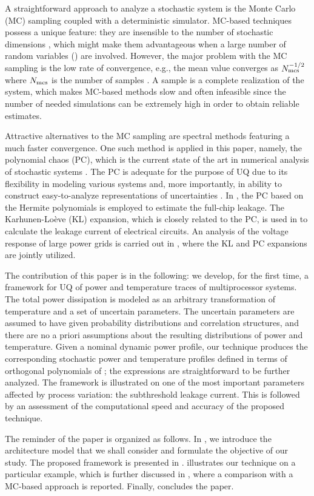 A straightforward approach to analyze a stochastic system is the Monte Carlo (MC) sampling coupled with a deterministic simulator. MC-based techniques possess a unique feature: they are insensible to the number of stochastic dimensions \cite{maitre2010}, which might make them advantageous when a large number of random variables (\rvs) are involved. However, the major problem with the MC sampling is the low rate of convergence, e.g., the mean value converges as $N_\text{mcs}^{-{{1}/{2}}}$ where $N_\text{mcs}$ is the number of samples \cite{xiu2010, maitre2010}. A sample is a complete realization of the system, which makes MC-based methods slow and often infeasible since the number of needed simulations can be extremely high in order to obtain reliable estimates.

Attractive alternatives to the MC sampling are spectral methods \cite{xiu2010, maitre2010, ghanem1991} featuring a much faster convergence. One such method is applied in this paper, namely, the polynomial chaos (PC), which is the current state of the art in numerical analysis of stochastic systems \cite{xiu2010}. The PC is adequate for the purpose of UQ due to its flexibility in modeling various systems and, more importantly, in ability to construct easy-to-analyze representations of uncertainties \cite{eldred2009}. In \cite{shen2009}, the PC based on the Hermite polynomials is employed to estimate the full-chip leakage. The Karhunen-Lo\`{e}ve (KL) expansion, which is closely related to the PC, is used in \cite{bhardwaj2006} to calculate the leakage current of electrical circuits. An analysis of the voltage response of large power grids is carried out in \cite{ghanta2006}, where the KL and PC expansions are jointly utilized.

The contribution of this paper is in the following: we develop, for the first time, a framework for UQ of power and temperature traces of multiprocessor systems. The total power dissipation is modeled as an arbitrary transformation of temperature and a set of uncertain parameters. The uncertain parameters are assumed to have given probability distributions and correlation structures, and there are no a priori assumptions about the resulting distributions of power and temperature. Given a nominal dynamic power profile, our technique produces the corresponding stochastic power and temperature profiles defined in terms of orthogonal polynomials of \rvs; the expressions are straightforward to be further analyzed. The framework is illustrated on one of the most important parameters affected by process variation: the subthreshold leakage current. This is followed by an assessment of the computational speed and accuracy of the proposed technique.

The reminder of the paper is organized as follows. In , we introduce the architecture model that we shall consider and formulate the objective of our study. The proposed framework is presented in .  illustrates our technique on a particular example, which is further discussed in , where a comparison with a MC-based approach is reported. Finally,  concludes the paper.
